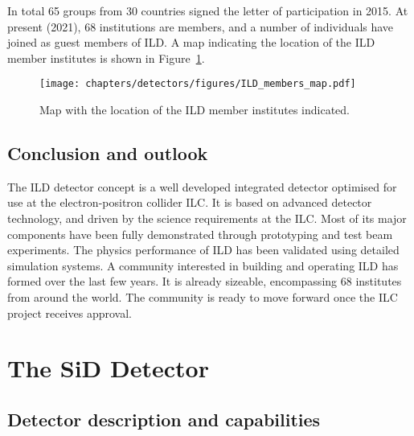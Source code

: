 In total 65 groups from 30 countries signed the letter of participation in 2015. At present (2021), 68 institutions are members, and a number of individuals have joined as guest members of ILD. A map indicating the location of the ILD member institutes is shown in Figure~\ref{ild-fig-membermap}.

\begin{figure}
    \centering
    \texttt{[image: chapters/detectors/figures/ILD\_members\_map.pdf]}
    \caption{Map with the location of the ILD member institutes indicated.}
    \label{ild-fig-membermap}
\end{figure}

\subsection{Conclusion and outlook}
The ILD detector concept is a well developed integrated detector optimised for use at the electron-positron collider ILC. It is based on advanced detector technology, and driven by the science requirements at the ILC. Most of its major components have been fully demonstrated through prototyping and test beam experiments. The physics performance of ILD has been validated using detailed simulation systems. A community interested in building and operating ILD has formed over the last few years. It is already sizeable, encompassing 68 institutes from around the world. The community is ready to move forward once the ILC project receives approval. 


%


\section{The SiD Detector} 
\label{SiD}



\subsection{Detector description and capabilities}
\label{SiD-gen}

